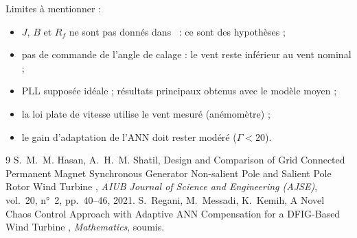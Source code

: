 \documentclass[11pt,a4paper]{article}
\theoremstyle{remark}
\begin{document}
Limites à mentionner :
\begin{itemize}
  \item $J$, $B$ et $R_f$ ne sont pas donnés dans~\cite{hasan} : ce sont des hypothèses ;
  \item pas de commande de l'angle de calage : le vent reste inférieur au vent nominal ;
  \item PLL supposée idéale ; résultats principaux obtenus avec le modèle moyen ;
  \item la loi plate de vitesse utilise le vent mesuré (anémomètre) ;
  \item le gain d'adaptation de l'ANN doit rester modéré ($\Gamma<20$).
\end{itemize}

\begin{thebibliography}{9}
 S.~M.~M. Hasan, A.~H.~M. Shatil, \og Design and Comparison of Grid Connected
Permanent Magnet Synchronous Generator Non-salient Pole and Salient Pole Rotor Wind Turbine \fg,
\emph{AIUB Journal of Science and Engineering (AJSE)}, vol.~20, n°~2, pp.~40--46, 2021.
 S.~Regani, M.~Messadi, K.~Kemih, \og A Novel Chaos Control Approach with Adaptive
ANN Compensation for a DFIG-Based Wind Turbine \fg, \emph{Mathematics}, soumis.
\end{thebibliography}
\end{document}
